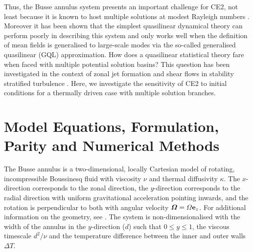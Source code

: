 \documentclass{jfm}
\begin{document}
Thus, the Busse annulus system presents an important challenge for CE2, not least because it is known to host multiple solutions at modest Rayleigh numbers \citep{bh1993}. Moreover it has been shown \citep[][]{tom_2018} that the simplest quasilinear dynamical theory can perform poorly in describing this system and only works well when the definition of mean fields is generalised to large-scale modes via the so-called generalised quasilinear (GQL) approximation. 
How does a quasilinear statistical theory fare when faced with multiple potential solution basins?
This question has been investigated in the context of zonal jet formation \citep{2003JAtS...60.2101F,2014JAtS...71.1818C} and shear flows in stability stratified turbulence \citep{2018JFM...854..544F}.
Here, we investigate the sensitivity of CE2 to initial conditions for a thermally driven case with multiple solution branches.

\section{Model Equations, Formulation, Parity and Numerical Methods}
\label{sec:model-eqations}


The Busse annulus is a two-dimensional, locally Cartesian model of rotating, incompressible Boussinesq fluid with viscosity $\nu$ and thermal diffusivity $\kappa$. The $x$-direction corresponds to the zonal direction, the $y$-direction corresponds to the radial direction with uniform gravitational acceleration pointing inwards, and the rotation is perpendicular to both with angular velocity ${\boldsymbol \Omega = \Omega {\bf e}_z}$. 
For additional information on the geometry, see \citep[][particularly figure 1]{tom_2018}.
The system is non-dimensionalised with the width of the annulus in the $y$-direction ($d$) such that $0 \le y \le 1$,  the viscous timescale $d^2/\nu$ and the temperature difference between the inner and outer walls $\Delta T$. 
\end{document}
